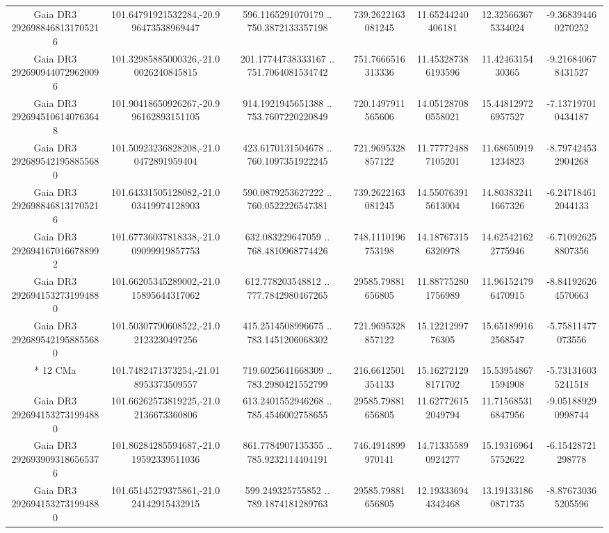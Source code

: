 \begin{table}
\begin{tabular}{ccccccc}
Gaia DR3 2926988468131705216 & 101.64791921532284,-20.996473538969447 & 596.1165291070179 .. 750.3872133357198 & 739.2622163081245 & 11.65244240406181 & 12.325663675334024 & -9.368394460270252 \\
Gaia DR3 2926909440729620096 & 101.32985885000326,-21.00026240845815 & 201.17744738333167 .. 751.7064081534742 & 751.7666516313336 & 11.453287386193596 & 11.4246315430365 & -9.216840678431527 \\
Gaia DR3 2926945106140763648 & 101.90418650926267,-20.996162893151105 & 914.1921945651388 .. 753.7607220220849 & 720.1497911565606 & 14.051287080558021 & 15.448129726957527 & -7.137197010434187 \\
Gaia DR3 2926895421958855680 & 101.50923236828208,-21.00472891959404 & 423.6170131504678 .. 760.1097351922245 & 721.9695328857122 & 11.777724887105201 & 11.686509191234823 & -8.797424532904268 \\
Gaia DR3 2926988468131705216 & 101.64331505128082,-21.003419974128903 & 590.0879253627222 .. 760.0522226547381 & 739.2622163081245 & 14.550763915613004 & 14.803832411667326 & -6.247184612044133 \\
Gaia DR3 2926941670166788992 & 101.67736037818338,-21.009099919857753 & 632.083229647059 .. 768.4810968774426 & 748.1110196753198 & 14.187673156320978 & 14.625421622775946 & -6.710926258807356 \\
Gaia DR3 2926941532731994880 & 101.66205345289002,-21.015895644317062 & 612.778203548812 .. 777.7842980467265 & 29585.79881656805 & 11.887752801756989 & 11.961524796470915 & -8.841926264570663 \\
Gaia DR3 2926895421958855680 & 101.50307790608522,-21.02123230497256 & 415.2514508996675 .. 783.1451206068302 & 721.9695328857122 & 15.1221299776305 & 15.651899162568547 & -5.75811477073556 \\
*  12 CMa & 101.7482471373254,-21.018953373509557 & 719.6025641668309 .. 783.2980421552799 & 216.6612501354133 & 15.162721298171702 & 15.539548671594908 & -5.731316035241518 \\
Gaia DR3 2926941532731994880 & 101.66262573819225,-21.02136673360806 & 613.2401552946268 .. 785.4546002758655 & 29585.79881656805 & 11.627726152049794 & 11.715685316847956 & -9.051889290998744 \\
Gaia DR3 2926939093186565376 & 101.86284285594687,-21.019592339511036 & 861.7784907135355 .. 785.9232114404191 & 746.4914899970141 & 14.713355890924277 & 15.193169645752622 & -6.15428721298778 \\
Gaia DR3 2926941532731994880 & 101.65145279375861,-21.024142915432915 & 599.249325755852 .. 789.1874181289763 & 29585.79881656805 & 12.193336944342468 & 13.191331860871735 & -8.876730365205596 \\

\end{tabular}
\end{table}
